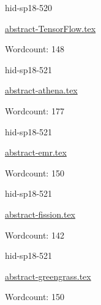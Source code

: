 

\begin{IU}

hid-sp18-520

\href{https://github.com/cloudmesh-community/hid-sp18-520/blob/master//technology/abstract-TensorFlow.tex}{abstract-TensorFlow.tex}

 

Wordcount: 148

\end{IU}



\begin{IU}

hid-sp18-521

\href{https://github.com/cloudmesh-community/hid-sp18-521/blob/master//technology/abstract-athena.tex}{abstract-athena.tex}

 

Wordcount: 177

\end{IU}



\begin{IU}

hid-sp18-521

\href{https://github.com/cloudmesh-community/hid-sp18-521/blob/master//technology/abstract-emr.tex}{abstract-emr.tex}

 

Wordcount: 150

\end{IU}



\begin{IU}

hid-sp18-521

\href{https://github.com/cloudmesh-community/hid-sp18-521/blob/master//technology/abstract-fission.tex}{abstract-fission.tex}

 

Wordcount: 142

\end{IU}



\begin{IU}

hid-sp18-521

\href{https://github.com/cloudmesh-community/hid-sp18-521/blob/master//technology/abstract-greengrass.tex}{abstract-greengrass.tex}

 

Wordcount: 150

\end{IU}

